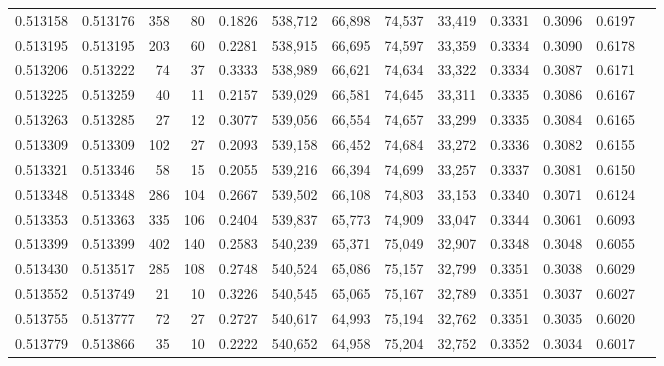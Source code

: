 \begin{tabular}{rrrrrrrrrrrrr}
0.513158 & 0.513176 &   358 &    80 &                                     0.1826 & 538,712 &  66,898 &  74,537 &  33,419 & 0.3331 & 0.3096 & 0.6197 \\
0.513195 & 0.513195 &   203 &    60 &                                     0.2281 & 538,915 &  66,695 &  74,597 &  33,359 & 0.3334 & 0.3090 & 0.6178 \\
0.513206 & 0.513222 &    74 &    37 &                                     0.3333 & 538,989 &  66,621 &  74,634 &  33,322 & 0.3334 & 0.3087 & 0.6171 \\
0.513225 & 0.513259 &    40 &    11 &                                     0.2157 & 539,029 &  66,581 &  74,645 &  33,311 & 0.3335 & 0.3086 & 0.6167 \\
0.513263 & 0.513285 &    27 &    12 &                                     0.3077 & 539,056 &  66,554 &  74,657 &  33,299 & 0.3335 & 0.3084 & 0.6165 \\
0.513309 & 0.513309 &   102 &    27 &                                     0.2093 & 539,158 &  66,452 &  74,684 &  33,272 & 0.3336 & 0.3082 & 0.6155 \\
0.513321 & 0.513346 &    58 &    15 &                                     0.2055 & 539,216 &  66,394 &  74,699 &  33,257 & 0.3337 & 0.3081 & 0.6150 \\
0.513348 & 0.513348 &   286 &   104 &                                     0.2667 & 539,502 &  66,108 &  74,803 &  33,153 & 0.3340 & 0.3071 & 0.6124 \\
0.513353 & 0.513363 &   335 &   106 &                                     0.2404 & 539,837 &  65,773 &  74,909 &  33,047 & 0.3344 & 0.3061 & 0.6093 \\
0.513399 & 0.513399 &   402 &   140 &                                     0.2583 & 540,239 &  65,371 &  75,049 &  32,907 & 0.3348 & 0.3048 & 0.6055 \\
0.513430 & 0.513517 &   285 &   108 &                                     0.2748 & 540,524 &  65,086 &  75,157 &  32,799 & 0.3351 & 0.3038 & 0.6029 \\
0.513552 & 0.513749 &    21 &    10 &                                     0.3226 & 540,545 &  65,065 &  75,167 &  32,789 & 0.3351 & 0.3037 & 0.6027 \\
0.513755 & 0.513777 &    72 &    27 &                                     0.2727 & 540,617 &  64,993 &  75,194 &  32,762 & 0.3351 & 0.3035 & 0.6020 \\
0.513779 & 0.513866 &    35 &    10 &                                     0.2222 & 540,652 &  64,958 &  75,204 &  32,752 & 0.3352 & 0.3034 & 0.6017 \\

\end{tabular}
